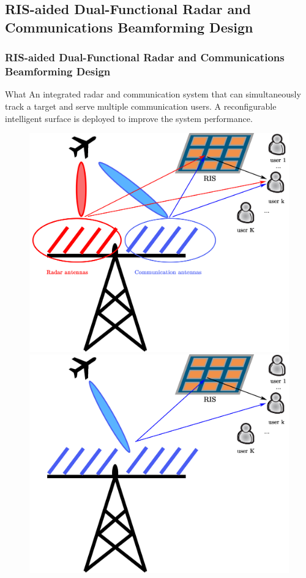 \subsection{RIS-aided Dual-Functional Radar and Communications Beamforming Design}

\begin{frame}
    \frametitle{RIS-aided Dual-Functional Radar and Communications Beamforming Design}
    \begin{block}{What}
        \small
        An integrated radar and communication system that can simultaneously track a target and serve multiple communication users.
        A reconfigurable intelligent surface is deployed to improve the system performance.   
    \end{block}
    \begin{figure}
        \centering
        \includegraphics[width=0.4\linewidth]{./img/separated_setup.png}
        \includegraphics[width=0.4\linewidth]{./img/shared_setup.png}
    \end{figure}
\end{frame}

